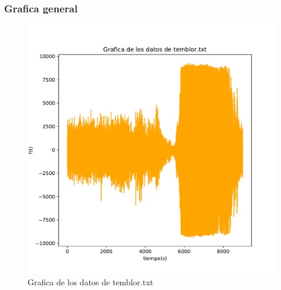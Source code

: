\documentclass[11pt,letterpaper]{exam}
\begin{document}
\subsubsection{Grafica general}
\begin{figure}[H]
    \centering
    \includegraphics[width=1\textwidth]{Temblor.pdf}
    \caption{Grafica de los datos de temblor.txt}
    \label{fig:my_label}
\end{figure}
\end{document}
